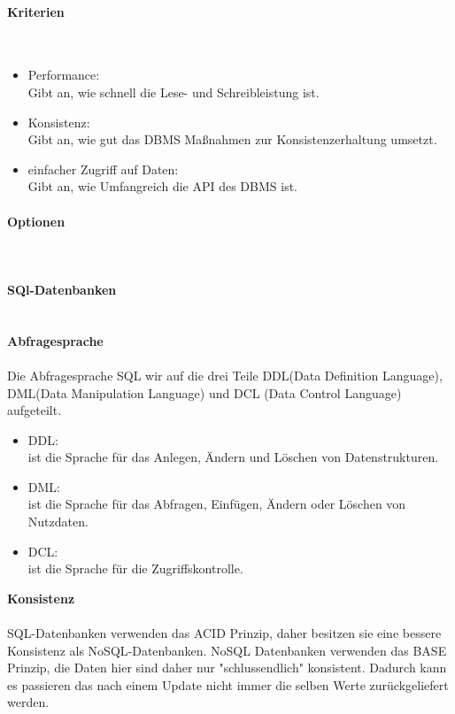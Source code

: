 \paragraph{Kriterien} \mbox{}\\

\begin{itemize}
	\item Performance: \\Gibt an, wie schnell die Lese- und Schreibleistung ist.
	\item Konsistenz: \\Gibt an, wie gut das DBMS Ma{\ss}nahmen zur Konsistenzerhaltung umsetzt.
	\item einfacher Zugriff auf Daten: \\Gibt an, wie Umfangreich die API des DBMS ist.
\end{itemize}

\paragraph{Optionen} \mbox{}\\

\paragraph{SQl-Datenbanken} \mbox{}\\

\textbf{Abfragesprache}\\\\
Die Abfragesprache SQL wir auf die drei Teile DDL(Data Definition Language),
DML(Data Manipulation Language) und DCL (Data Control Language) aufgeteilt.

\begin{itemize}
	\item DDL:\\ ist die Sprache f\"ur das Anlegen, \"Andern und L\"oschen von Datenstrukturen.
	\item DML:\\ ist die Sprache f\"ur das Abfragen, Einf\"ugen, \"Andern oder L\"oschen von Nutzdaten.
	\item DCL:\\ ist die Sprache f\"ur die Zugriffskontrolle.
\end{itemize}
\textbf{Konsistenz}\\\\
SQL-Datenbanken verwenden das ACID Prinzip, daher besitzen sie eine bessere Konsistenz als
NoSQL-Datenbanken. NoSQL Datenbanken verwenden das BASE Prinzip, die Daten hier sind daher
nur "schlussendlich" konsistent. Dadurch kann es passieren das nach einem Update nicht immer
die selben Werte zur\"uckgeliefert werden.


